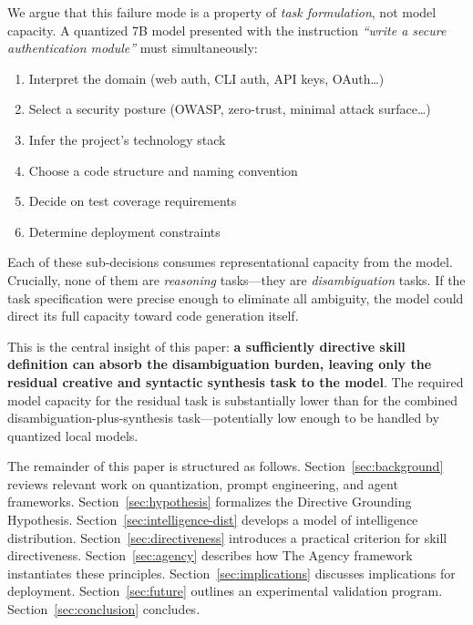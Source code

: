 \documentclass[11pt,a4paper]{article}
\begin{document}
We argue that this failure mode is a property of \emph{task formulation}, not
model capacity. A quantized 7B model presented with the instruction
\textit{``write a secure authentication module''} must simultaneously:

\begin{enumerate}[noitemsep]
  \item Interpret the domain (web auth, CLI auth, API keys, OAuth\ldots)
  \item Select a security posture (OWASP, zero-trust, minimal attack surface\ldots)
  \item Infer the project's technology stack
  \item Choose a code structure and naming convention
  \item Decide on test coverage requirements
  \item Determine deployment constraints
\end{enumerate}

Each of these sub-decisions consumes representational capacity from the model.
Crucially, none of them are \emph{reasoning} tasks—they are
\emph{disambiguation} tasks. If the task specification were precise enough to
eliminate all ambiguity, the model could direct its full capacity toward code
generation itself.

This is the central insight of this paper: \textbf{a sufficiently directive
skill definition can absorb the disambiguation burden, leaving only the
residual creative and syntactic synthesis task to the model}. The required
model capacity for the residual task is substantially lower than for the
combined disambiguation-plus-synthesis task—potentially low enough to be
handled by quantized local models.

The remainder of this paper is structured as follows. Section~\ref{sec:background}
reviews relevant work on quantization, prompt engineering, and agent frameworks.
Section~\ref{sec:hypothesis} formalizes the Directive Grounding Hypothesis.
Section~\ref{sec:intelligence-dist} develops a model of intelligence
distribution. Section~\ref{sec:directiveness} introduces a practical criterion
for skill directiveness. Section~\ref{sec:agency} describes how The Agency
framework instantiates these principles. Section~\ref{sec:implications}
discusses implications for deployment. Section~\ref{sec:future} outlines an
experimental validation program. Section~\ref{sec:conclusion} concludes.

\end{document}
